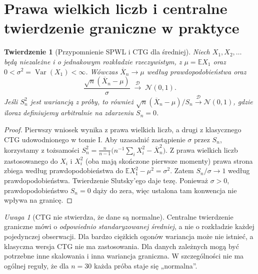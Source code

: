 \documentclass[11pt,a4paper,oneside]{report}
\numberwithin{equation}{chapter}
\theoremstyle{plain}
\newtheorem{twierdzenie}{Twierdzenie}[chapter]
\theoremstyle{definition}
\theoremstyle{remark}
\newtheorem{uwaga}{Uwaga}[chapter]
\newcommand{\E}{\mathbb E}
\newcommand{\Var}{\operatorname{Var}}
\newcommand{\Normal}{\mathcal N}
\begin{document}
\section{Prawa wielkich liczb i centralne twierdzenie graniczne w praktyce}
\begin{twierdzenie}[Przypomnienie SPWL i CTG dla średniej]\label{thm:clt-review}
Niech $X_1,X_2,\ldots$ będą niezależne i o jednakowym rozkładzie rzeczywistym, z $\mu=\E X_1$ oraz $0<\sigma^2=\Var(X_1)<\infty$. Wówczas $\overline X_n\to\mu$ według prawdopodobieństwa oraz
\[
\frac{\sqrt n(\overline X_n-\mu)}{\sigma}\;\xrightarrow{\mathcal D}\;\Normal(0,1).
\]
Jeśli $S_n^2$ jest wariancją z próby, to również
$\sqrt n(\overline X_n-\mu)/S_n\xrightarrow{\mathcal D}\Normal(0,1)$, gdzie iloraz definiujemy arbitralnie na zdarzeniu $S_n=0$.
\end{twierdzenie}
\begin{proof}
Pierwszy wniosek wynika z prawa wielkich liczb, a drugi z klasycznego CTG udowodnionego w tomie I. Aby uzasadnić zastąpienie $\sigma$ przez $S_n$, korzystamy z tożsamości
$S_n^2=\tfrac n{n-1}\bigl(n^{-1}\sum_iX_i^2-\overline X_n^2\bigr)$. Z prawa wielkich liczb zastosowanego do $X_i$ i $X_i^2$ (oba mają skończone pierwsze momenty) prawa strona zbiega według prawdopodobieństwa do $\E X_1^2-\mu^2=\sigma^2$. Zatem $S_n/\sigma\to1$ według prawdopodobieństwa. Twierdzenie Slutsky'ego daje tezę. Ponieważ $\sigma>0$, prawdopodobieństwo $S_n=0$ dąży do zera, więc ustalona tam konwencja nie wpływa na granicę.
\end{proof}

\begin{uwaga}[CTG nie stwierdza, że dane są normalne]
Centralne twierdzenie graniczne mówi o \emph{odpowiednio standaryzowanej średniej}, a nie o rozkładzie każdej pojedynczej obserwacji. Dla bardzo ciężkich ogonów wariancja może nie istnieć, a klasyczna wersja CTG nie ma zastosowania. Dla danych zależnych mogą być potrzebne inne skalowania i inna wariancja graniczna. W szczególności nie ma ogólnej reguły, że dla $n=30$ każda próba staje się „normalna”.
\end{uwaga}
\end{document}
